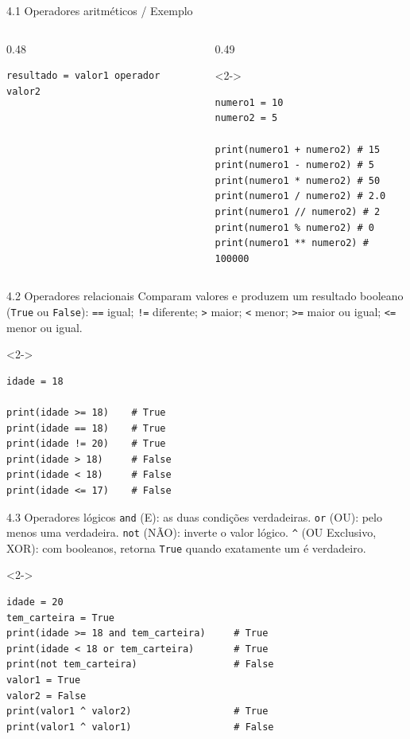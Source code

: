 \begin{frame}[fragile,t]{4.1 Operadores aritméticos / Exemplo}
\begin{columns}[T,onlytextwidth]
\begin{column}{0.48\textwidth}
\begin{lstlisting}
resultado = valor1 operador valor2
\end{lstlisting}
\end{column}
\begin{column}{0.49\textwidth}
\begin{visibleenv}<2->
\begin{lstlisting}
numero1 = 10
numero2 = 5

print(numero1 + numero2) # 15
print(numero1 - numero2) # 5
print(numero1 * numero2) # 50
print(numero1 / numero2) # 2.0
print(numero1 // numero2) # 2
print(numero1 % numero2) # 0
print(numero1 ** numero2) # 100000
\end{lstlisting}
\end{visibleenv}
\end{column}
\end{columns}
\end{frame}

\begin{frame}[fragile,t]{4.2 Operadores relacionais}
Comparam valores e produzem um resultado booleano (\texttt{True} ou \texttt{False}): \texttt{==} igual; \texttt{!=} diferente; \texttt{\textgreater{}} maior; \texttt{\textless{}} menor; \texttt{\textgreater{}=} maior ou igual; \texttt{\textless{}=} menor ou igual.\par
\begin{visibleenv}<2->
\begin{lstlisting}
idade = 18

print(idade >= 18)    # True
print(idade == 18)    # True
print(idade != 20)    # True
print(idade > 18)     # False
print(idade < 18)     # False
print(idade <= 17)    # False
\end{lstlisting}
\end{visibleenv}
\end{frame}

\begin{frame}[fragile,t]{4.3 Operadores lógicos}
\texttt{and} (E): as duas condições verdadeiras. \texttt{or} (OU): pelo menos uma verdadeira. \texttt{not} (NÃO): inverte o valor lógico. \texttt{\textasciicircum} (OU Exclusivo, XOR): com booleanos, retorna \texttt{True} quando exatamente um é verdadeiro.\par
\begin{visibleenv}<2->
\begin{lstlisting}
idade = 20
tem_carteira = True
print(idade >= 18 and tem_carteira)     # True
print(idade < 18 or tem_carteira)       # True
print(not tem_carteira)                 # False
valor1 = True
valor2 = False
print(valor1 ^ valor2)                  # True
print(valor1 ^ valor1)                  # False
\end{lstlisting}
\end{visibleenv}
\end{frame}
